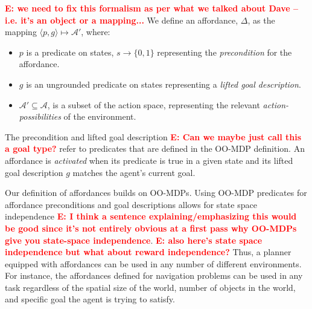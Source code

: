\documentclass[conference]{IEEEtran}
\newcommand{\enote}[1]{\textcolor{Red}{\textbf{E: #1}}}
\begin{document}




\enote{we need to fix this formalism as per what we talked about Dave -- i.e. it's an object or a mapping...}
 We define an affordance, $\Delta$,
as the mapping $\langle p,g\rangle \longmapsto \mathcal{A}'$,
where:
\begin{itemize}
\item $p$ is a predicate on states, $s \longrightarrow \{$0$, 1\}$
  representing the {\em precondition} for the affordance. 
\item $g$ is an ungrounded predicate on states representing a {\it lifted goal description}.
\item $\mathcal{A}' \subseteq \mathcal{A}$, is a subset of the action space, representing the relevant {\it action-possibilities} of the environment.
\end{itemize}
The precondition and lifted goal description \enote{Can we maybe just call this a goal type?} refer to predicates that are defined in the OO-MDP definition.
An affordance is {\it activated} when its predicate is true in a given state and its lifted goal description $g$ matches the agent's current goal. 

Our definition of affordances builds on OO-MDPs. Using OO-MDP predicates for affordance preconditions and goal descriptions 
allows for state space independence \enote{I think a sentence explaining/emphasizing this would be good since it's not entirely obvious at a first pass why OO-MDPs give you state-space independence}. \enote{also here's state space independence but what about reward independence?} Thus, a planner equipped with
affordances can be used in any number of different environments. For instance, the affordances defined for 
navigation problems can be used in any task regardless of the spatial size of the world, 
number of objects in the world, and specific goal the agent is trying to satisfy.
\end{document}
